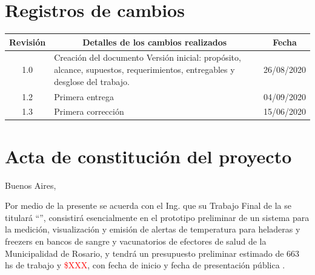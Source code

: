 \documentclass[11pt]{charter}
\begin{document}
\maketitle
\thispagestyle{empty}
\pagebreak


\thispagestyle{empty}
{\setlength{\parskip}{0pt}
\tableofcontents{}
}
\pagebreak


\section{Registros de cambios}
\label{sec:registro}


\begin{table}[ht]
\label{tab:registro}
\centering
\begin{tabularx}{\linewidth}{@{}|c|X|c|@{}}
\hline
\rowcolor[HTML]{C0C0C0} 
Revisión & \multicolumn{1}{c|}{\cellcolor[HTML]{C0C0C0}Detalles de los cambios realizados} & Fecha      \\ \hline
1.0      & Creación del documento \newline Versión inicial: propósito, alcance, supuestos, requerimientos, entregables y desglose del trabajo.
                                         & 26/08/2020 \\ \hline
1.2      & Primera entrega                                                                 & 04/09/2020 \\ \hline
1.3      & Primera corrección &15/06/2020\\\hline
\end{tabularx}
\end{table}

\pagebreak



\section{Acta de constitución del proyecto}
\label{sec:acta}

\begin{flushright}
Buenos Aires, \fechaInicioName
\end{flushright}

\vspace{2cm}

Por medio de la presente se acuerda con el Ing. \authorname\hspace{1px} que su Trabajo Final de la \degreename\hspace{1px} se titulará ``\ttitle'', consistirá esencialmente en el prototipo preliminar de un sistema para la medición, visualización y emisión de alertas de temperatura para heladeras y freezers en bancos de sangre y vacunatorios de efectores de salud de la Municipalidad de Rosario, y tendrá un presupuesto preliminar estimado de 663 hs de trabajo y \textcolor{red}{\$XXX}, con fecha de inicio \fechaInicioName\hspace{1px} y fecha de presentación pública \fechaFinalName.
\end{document}
